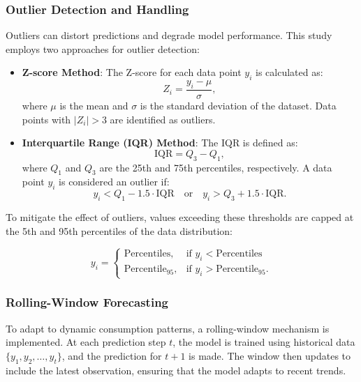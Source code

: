 \documentclass[journal]{IEEEtran}
\begin{document}
\subsubsection{Outlier Detection and Handling}
Outliers can distort predictions and degrade model performance. This study employs two approaches for outlier detection:

\begin{itemize}
    \item \textbf{Z-score Method}: The Z-score for each data point \(y_{i}\) is calculated as:
    \begin{equation}
    Z_{i}=\frac{y_{i}-\mu}{\sigma},
    \end{equation}
    where \(\mu\) is the mean and \(\sigma\) is the standard deviation of the dataset. Data points with \(|Z_{i}|>3\) are identified as outliers.

    \item \textbf{Interquartile Range (IQR) Method}: The IQR is defined as:
    \begin{equation}
    \text{IQR}=Q_{3}-Q_{1},
    \end{equation}
    where \(Q_{1}\) and \(Q_{3}\) are the 25th and 75th percentiles, respectively. A data point \(y_{i}\) is considered an outlier if:
    \begin{equation}
    y_{i}<Q_{1}-1.5\cdot\text{IQR}\quad\text{or}\quad y_{i}>Q_{3}+1.5\cdot\text{IQR}.
    \end{equation}
\end{itemize}

To mitigate the effect of outliers, values exceeding these thresholds are capped at the 5th and 95th percentiles of the data distribution:

\begin{equation}
y_{i}=\begin{cases}\text{Percentiles},&\text{if }y_{i}<\text{Percentiles}\\ \text{Percentile}_{95},&\text{if }y_{i}>\text{Percentile}_{95}.\end{cases}
\end{equation}

\subsubsection{Rolling-Window Forecasting}
To adapt to dynamic consumption patterns, a rolling-window mechanism is implemented. At each prediction step \(t\), the model is trained using historical data \(\{y_{1},y_{2},\ldots,y_{t}\}\), and the prediction for \(t+1\) is made. The window then updates to include the latest observation, ensuring that the model adapts to recent trends.
\end{document}
